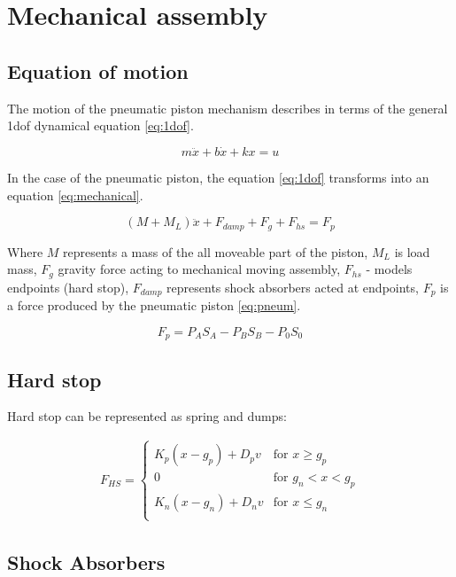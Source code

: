 \section{Mechanical assembly}
\subsection{Equation of motion}

The motion of the pneumatic piston mechanism describes in terms of the
general 1dof dynamical equation \ref{eq:1dof}. 

\begin{equation}
    m\ddot{x} + b\dot{x} + kx = u
    \label{eq:1dof}
\end{equation}

In the case of the pneumatic piston, the equation \ref{eq:1dof}
transforms into an equation \ref{eq:mechanical}.

\begin{equation}
    (M + M_L) \ddot{x} + F_{damp} + F_g + F_{hs}  = F_p
    \label{eq:mechanical}
\end{equation}

Where $M$ represents a mass of the all moveable part of the piston,
$M_L$ is load mass, $F_g$ gravity force acting to mechanical moving assembly,
$F_{hs}$ - models endpoints (hard stop),
$F_{damp}$ represents shock absorbers acted at endpoints,
$F_{p}$ is a force produced by the pneumatic piston \ref{eq:pneum}.

\begin{equation}
    F_p = P_A S_A - P_B S_B - P_0 S_0
    \label{eq:pneum}
\end{equation}

\subsection{Hard stop}
Hard stop can be represented as spring and dumps:

\begin{align}
    F_{HS} =
    \begin{cases}
        K_p(x-g_p) + D_pv & \text{for } x \ge g_p \\
        0 & \text{for } g_n < x < g_p \\
        K_n(x-g_n) + D_nv & \text{for } x \le g_n \\
    \end{cases}
\end{align}


\subsection{Shock Absorbers}
